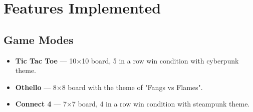 \documentclass[12pt, a4paper]{article}
\begin{document}
\section{Features Implemented}

\subsection{Game Modes}
\begin{itemize}
    \item \textbf{Tic Tac Toe} — 10×10 board, 5 in a row win condition with cyberpunk theme.
    \item \textbf{Othello} — 8×8 board with the theme of "Fangs vs Flames".
    \item \textbf{Connect 4} — 7×7 board, 4 in a row win condition with steampunk theme.
\end{itemize}
\end{document}
